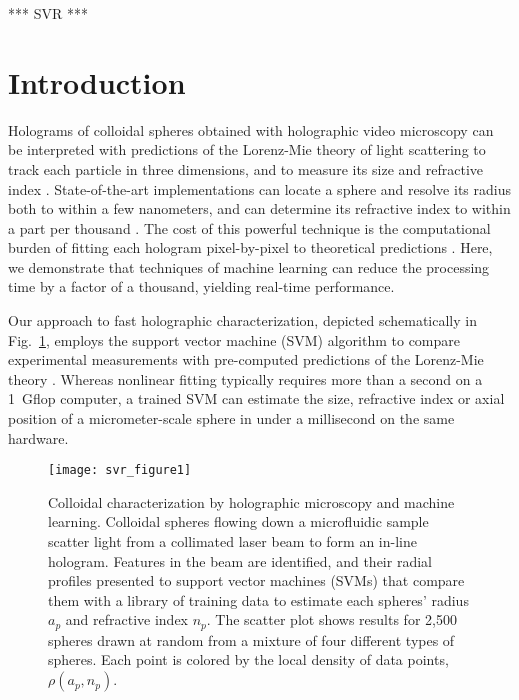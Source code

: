 ***
SVR
***

\section{Introduction}

Holograms of colloidal spheres obtained 
with holographic video microscopy
\cite{sheng06,lee07}
can be interpreted with predictions of the Lorenz-Mie theory 
of light scattering \cite{bohren83}
to track each particle in three dimensions, and to measure 
its size and refractive index \cite{lee07a}.
State-of-the-art implementations \cite{lee07a,bourquard13,seifi13,fung13}
can locate a sphere and resolve its
radius both to within a few nanometers, and 
can determine its refractive index to within a part per thousand
\cite{cheong09,shpaisman12,krishnatreya14}.
The cost of this powerful technique is the computational burden of
fitting each hologram pixel-by-pixel to theoretical predictions
\cite{lee07a,cheong10a}.
Here, we demonstrate that techniques of machine learning
can reduce the processing time by a factor of a thousand,
yielding real-time performance.

Our approach to fast holographic characterization,
depicted schematically in Fig.~\ref{fig:method},
employs the support vector machine (SVM) algorithm
\cite{smola04} 
to compare experimental measurements with
pre-computed predictions of the Lorenz-Mie theory
\cite{bohren83,lee07a,krishnatreya14a}.
Whereas nonlinear fitting typically requires more than a second
on a \SI{1}{\giga flop} computer,
a trained SVM can estimate the size, refractive index or
axial position of a micrometer-scale sphere
in under a millisecond on the same hardware.

\begin{figure}
  \centering
  \texttt{[image: svr\_figure1]}
  \caption{Colloidal characterization by holographic microscopy and
    machine learning.  Colloidal spheres flowing down a microfluidic
    sample scatter light from a collimated laser beam to form an
    in-line hologram.  Features in the beam are identified, and their
    radial profiles presented to support vector machines (SVMs)
    that compare them with a library of training data to estimate
    each spheres' radius $a_p$ and refractive index
    $n_p$.  The scatter plot shows results for 2,500 spheres
    drawn at random from a mixture of four different types of
    spheres.  Each point is colored by the local density of
    data points, $\rho(a_p,n_p)$.}
  \label{fig:method}
\end{figure}

